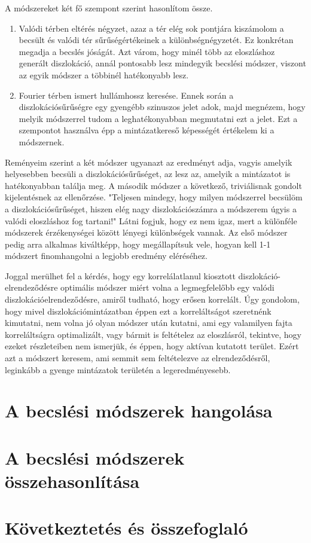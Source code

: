 \documentclass[10pt,a4paper]{scrartcl}
\begin{document}
A módszereket két fő szempont szerint hasonlítom össze.
\begin{enumerate}
    \item Valódi térben eltérés négyzet, azaz a tér elég sok pontjára kiszámolom a becsült és valódi tér sűrűségértékeinek a különbségnégyzetét. Ez konkrétan megadja a becslés jóságát. Azt várom, hogy minél több az eloszláshoz generált diszlokáció, annál pontosabb lesz mindegyik becslési módszer, viszont az egyik módszer a többinél hatékonyabb lesz.
    \item Fourier térben ismert hullámhossz keresése. Ennek során a diszlokációsűrűségre egy gyengébb szinuszos jelet adok, majd megnézem, hogy melyik módszerrel tudom a leghatékonyabban megmutatni ezt a jelet. Ezt a szempontot használva épp a mintázatkereső képességét értékelem ki a módszernek.
\end{enumerate}

Reményeim szerint a két módszer ugyanazt az eredményt adja, vagyis amelyik helyesebben becsüli a diszlokációsűrűséget, az lesz az, amelyik a mintázatot is hatékonyabban találja meg. A második módszer a következő, triviálisnak gondolt kijelentésnek az ellenőrzése. "Teljesen mindegy, hogy milyen módszerrel becsülöm a diszlokációsűrűséget, hiszen elég nagy diszlokációszámra a módszerem úgyis a valódi eloszláshoz fog tartani!" Látni fogjuk, hogy ez nem igaz, mert a különféle módszerek érzékenységei között lényegi különbségek vannak. Az első módszer pedig arra alkalmas kiváltképp, hogy megállapítsuk vele, hogyan kell 1-1 módszert finomhangolni a legjobb eredmény eléréséhez.

Joggal merülhet fel a kérdés, hogy egy korrelálatlanul kiosztott diszlokáció-elrendeződésre optimális módszer miért volna a legmegfelelőbb egy valódi diszlokációelrendeződésre, amiről tudható, hogy erősen korrelált. Úgy gondolom, hogy mivel diszlokációmintázatban éppen ezt a korreláltságot szeretnénk kimutatni, nem volna jó olyan módszer után kutatni, ami egy valamilyen fajta korreláltságra optimalizált, vagy bármit is feltételez az eloszlásról, tekintve, hogy ezeket részleteiben nem ismerjük, és éppen, hogy aktívan kutatott terület. Ezért azt a módszert keresem, ami semmit sem feltételezve az elrendeződésről, leginkább a gyenge mintázatok területén a legeredményesebb.

\section{A becslési módszerek hangolása}

\section{A becslési módszerek összehasonlítása}

\section{Következtetés és összefoglaló}
\end{document}
